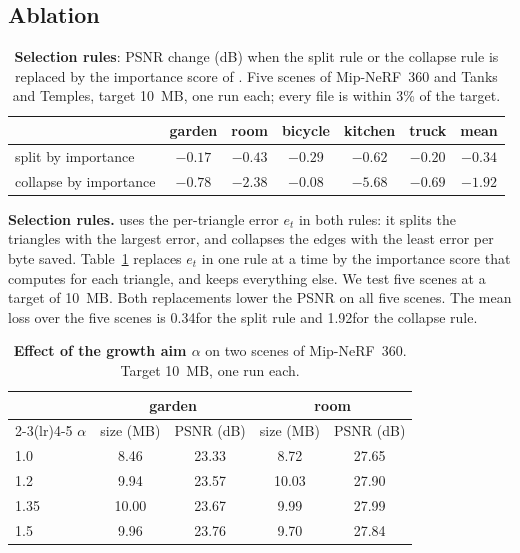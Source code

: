 \subsection{Ablation}
\label{sec:abl}

\begin{table}[t]\centering\footnotesize
\caption{\textbf{Selection rules}: PSNR change (dB) when the split rule or the collapse rule is replaced by the importance score of \MS. Five scenes of Mip-NeRF~360 and Tanks and Temples, target 10~MB, one run each; every file is within 3\% of the target.}
\label{tab:abl}
\setlength{\tabcolsep}{3.2pt}
\begin{tabular}{@{}lcccccc@{}}
\toprule
 & garden & room & bicycle & kitchen & truck & mean \\
\midrule
split by importance & $-0.17$ & $-0.43$ & $-0.29$ & $-0.62$ & $-0.20$ & $-0.34$ \\
collapse by importance & $-0.78$ & $-2.38$ & $-0.08$ & $-5.68$ & $-0.69$ & $-1.92$ \\
\bottomrule
\end{tabular}
\end{table}

\noindent\textbf{Selection rules.} \BM uses the per-triangle error $e_t$ in both rules: it splits the triangles with the largest error, and collapses the edges with the least error per byte saved. Table~\ref{tab:abl} replaces $e_t$ in one rule at a time by the importance score that \MS computes for each triangle, and keeps everything else. We test five scenes at a target of 10~MB. Both replacements lower the PSNR on all five scenes. The mean loss over the five scenes is 0.34\dB for the split rule and 1.92\dB for the collapse rule.

\begin{table}[t]\centering\footnotesize
\caption{\textbf{Effect of the growth aim $\alpha$} on two scenes of Mip-NeRF~360. Target 10~MB, one run each.}
\label{tab:alpha}
\setlength{\tabcolsep}{5pt}
\begin{tabular}{@{}lcccc@{}}
\toprule
 & \multicolumn{2}{c}{garden} & \multicolumn{2}{c}{room} \\
\cmidrule(lr){2-3}\cmidrule(lr){4-5}
$\alpha$ & size (MB) & PSNR (dB) & size (MB) & PSNR (dB) \\
\midrule
1.0 & 8.46 & 23.33 & 8.72 & 27.65 \\
1.2 & 9.94 & 23.57 & 10.03 & 27.90 \\
1.35 & 10.00 & 23.67 & 9.99 & 27.99 \\
1.5 & 9.96 & 23.76 & 9.70 & 27.84 \\
\bottomrule
\end{tabular}
\end{table}

